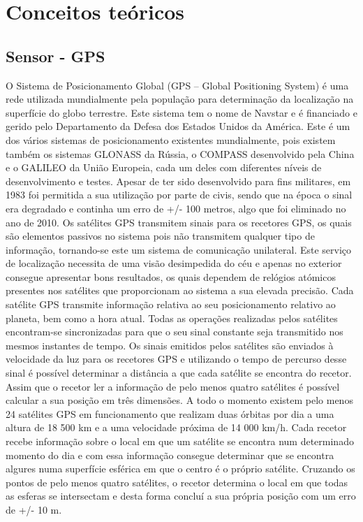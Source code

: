 \chapter{Conceitos teóricos}
\label{cha:conceitos_teoricos}

\section{Sensor - GPS}
\label{sec:gps}

O Sistema de Posicionamento Global (GPS – Global Positioning System) é uma rede utilizada mundialmente pela população para determinação da localização na superfície do globo terrestre. 
Este sistema tem o nome de Navstar e é financiado e gerido pelo Departamento da Defesa dos Estados Unidos da América.
Este é um dos vários sistemas de posicionamento existentes mundialmente, pois existem também os sistemas GLONASS da Rússia, o COMPASS desenvolvido pela China e o GALILEO da União Europeia, cada um deles com diferentes níveis de desenvolvimento e testes.
Apesar de ter sido desenvolvido para fins militares, em 1983 foi permitida a sua utilização por parte de civis, sendo que na época o sinal era degradado e continha um erro de +/- 100 metros, algo que foi eliminado no ano de 2010.
Os satélites GPS transmitem sinais para os recetores GPS, os quais são elementos passivos no sistema pois não transmitem qualquer tipo de informação, tornando-se este um sistema de comunicação unilateral.
Este serviço de localização necessita de uma visão desimpedida do céu e apenas no exterior consegue apresentar bons resultados, os quais dependem de relógios atómicos presentes nos satélites que proporcionam ao sistema a sua elevada precisão.
Cada satélite GPS transmite informação relativa ao seu posicionamento relativo ao planeta, bem como a hora atual.
Todas as operações realizadas pelos satélites encontram-se sincronizadas para que o seu sinal constante seja transmitido nos mesmos instantes de tempo.
Os sinais emitidos pelos satélites são enviados à velocidade da luz para os recetores GPS e utilizando o tempo de percurso desse sinal é possível determinar a distância a que cada satélite se encontra do recetor.
Assim que o recetor ler a informação de pelo menos quatro satélites é possível calcular a sua posição em três dimensões.
A todo o momento existem pelo menos 24 satélites GPS em funcionamento que realizam duas órbitas por dia a uma altura de 18 500 km e a uma velocidade próxima de 14 000 km/h.
Cada recetor recebe informação sobre o local em que um satélite se encontra num determinado momento do dia e com essa informação consegue determinar que se encontra algures numa superfície esférica em que o centro é o próprio satélite.
Cruzando os pontos de pelo menos quatro satélites, o recetor determina o local em que todas as esferas se intersectam e desta forma concluí a sua própria posição com um erro de +/- 10 m.

